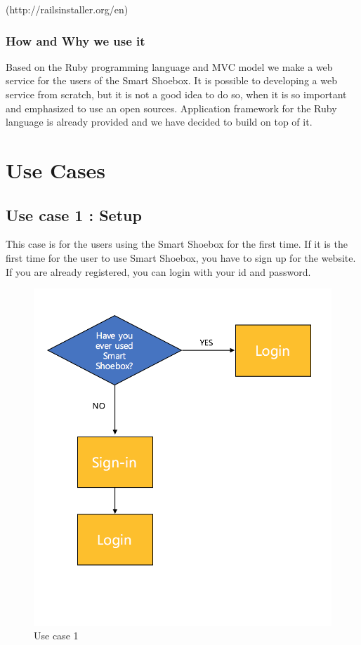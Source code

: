 \documentclass[conference]{IEEEtran}
\begin{document}
(http://railsinstaller.org/en)
\subsubsection{How and Why we use it} Based on the Ruby programming language and MVC model we make a web service for the users of the Smart Shoebox. It is possible to developing a web service from scratch, but it is not a good idea to do so, when it is so important and emphasized to use an open sources. Application framework for the Ruby language is already provided and we have decided to build on top of it.

\section{Use Cases}
\subsection{Use case 1 : Setup} This case is for the users using the Smart Shoebox for the first time.  If it is the first time for the user to use Smart Shoebox, you have to sign up for the website. If you are already registered, you can login with your id and password.
\begin{figure}[h]
\begin{center}
    \includegraphics[scale=0.5]{usecase1}
    \caption{Use case 1} \label{fig:label}
\end{center}
\end{figure}
\end{document}
